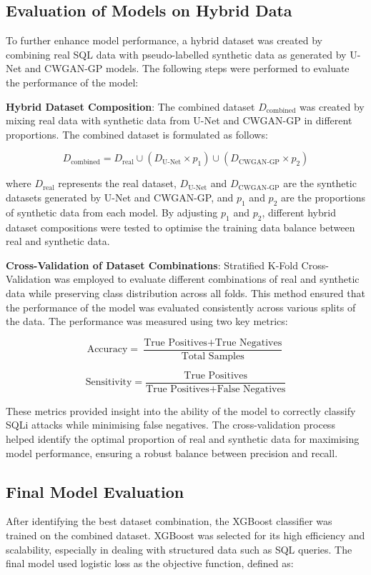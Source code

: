 \documentclass[journal]{IEEEtran}
\begin{document}
\subsection{Evaluation of Models on Hybrid Data}
To further enhance model performance, a hybrid dataset was created by combining real SQL data with pseudo-labelled synthetic data as generated by U-Net and CWGAN-GP models. The following steps were performed to evaluate the performance of the model:

\textbf{Hybrid Dataset Composition}: The combined dataset \( D_{\text{combined}} \) was created by mixing real data with synthetic data from U-Net and CWGAN-GP in different proportions. The combined dataset is formulated as follows:

\[
D_{\text{combined}} = D_{\text{real}} \cup (D_{\text{U-Net}} \times p_1) \cup (D_{\text{CWGAN-GP}} \times p_2)
\]

where \( D_{\text{real}} \) represents the real dataset, \( D_{\text{U-Net}} \) and \( D_{\text{CWGAN-GP}} \) are the synthetic datasets generated by U-Net and CWGAN-GP, and \( p_1 \) and \( p_2 \) are the proportions of synthetic data from each model. By adjusting \( p_1 \) and \( p_2 \), different hybrid dataset compositions were tested to optimise the training data balance between real and synthetic data.

\textbf{Cross-Validation of Dataset Combinations}: Stratified K-Fold Cross-Validation was employed to evaluate different combinations of real and synthetic data while preserving class distribution across all folds. This method ensured that the performance of the model was evaluated consistently across various splits of the data. The performance was measured using two key metrics:

\[
\text{Accuracy} = \frac{\text{True Positives} + \text{True Negatives}}{\text{Total Samples}}
\]

\[
\text{Sensitivity} = \frac{\text{True Positives}}{\text{True Positives} + \text{False Negatives}}
\]

These metrics provided insight into the ability of the model to correctly classify SQLi attacks while minimising false negatives. The cross-validation process helped identify the optimal proportion of real and synthetic data for maximising model performance, ensuring a robust balance between precision and recall.

\subsection{Final Model Evaluation}
After identifying the best dataset combination, the XGBoost classifier was trained on the combined dataset. XGBoost was selected for its high efficiency and scalability, especially in dealing with structured data such as SQL queries. The final model used logistic loss as the objective function, defined as:
\end{document}

